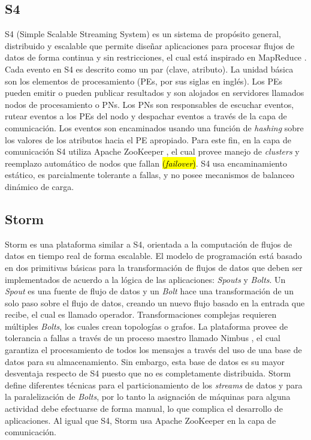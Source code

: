 \subsection{S4}
S4 (Simple Scalable Streaming System) \citep{s4yahoo} es un sistema de propósito general, distribuido y escalable que permite diseñar aplicaciones para procesar flujos de datos de forma continua y sin restricciones, el cual está inspirado en MapReduce \citep{2010Lin}. Cada evento en S4 es descrito como un par (clave, atributo). La unidad básica son los elementos de procesamiento (PEs, por sus siglas en inglés). Los PEs pueden emitir o pueden publicar resultados y son alojados en servidores llamados nodos de procesamiento o PNs. Los PNs son responsables de escuchar eventos, rutear eventos a los PEs del nodo y despachar eventos a través de la capa de comunicación. Los eventos son encaminados usando una función de \textsl{hashing} sobre los valores de los atributos hacia el PE apropiado. Para este fin, en la capa de comunicación S4 utiliza Apache ZooKeeper \citep{HuntKJR10}, el cual provee manejo de \textit{clusters} y reemplazo automático de nodos que fallan \hl{(\textit{failover})}. S4 usa encaminamiento estático, es parcialmente tolerante a fallas, y no posee mecanismos de balanceo dinámico de carga.

\subsection{Storm}
Storm \citep{bookstorm} es una plataforma similar a S4, orientada a la computación de flujos de datos en tiempo real de forma escalable. El modelo de programación está basado en dos primitivas básicas para la transformación de flujos de datos que deben ser implementados de acuerdo a la lógica de las aplicaciones: \textit{Spouts} y \textit{Bolts}. Un \textit{Spout} es una fuente de flujo de datos y un \textit{Bolt} hace una transformación de un solo paso sobre el flujo de datos, creando un nuevo flujo basado en la entrada que recibe, el cual es llamado operador. Transformaciones complejas requieren múltiples \textit{Bolts}, los cuales crean topologías o grafos. La plataforma provee de tolerancia a fallas a través de un proceso maestro llamado Nimbus \citep{MiaoYJ14}, el cual garantiza el procesamiento de todos los mensajes a través del uso de una base de datos para su almacenamiento. Sin embargo, esta base de datos es su mayor desventaja respecto de S4 puesto que no es completamente distribuida. Storm define diferentes técnicas para el particionamiento de los \textit{streams} de datos y para la paralelización de \textit{Bolts}, por lo tanto la asignación de máquinas para alguna actividad debe efectuarse de forma manual, lo que complica el desarrollo de aplicaciones. Al igual que S4, Storm usa Apache ZooKeeper \citep{HuntKJR10} en la capa de comunicación.

